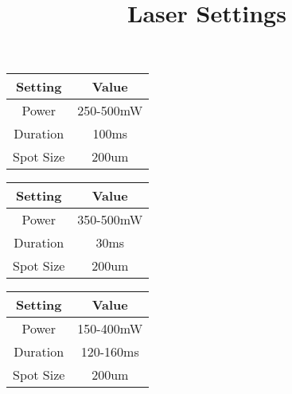 \documentclass[docmentpaper=a4,oneside.fontsize=12pt,parskip=full]{scrartcl}
\title{Laser Settings}
\date{}
\author{}
\begin{document}
\maketitle


\begin{table}[h]
	\centering
	\begin{tabular}{|c|c|}
		\hline
		Setting & Value\\
		\hline
		Power & 250-500mW \\
		\hline
		Duration & 100ms \\
		\hline
		Spot Size & 200um\\
		\hline
	\end{tabular}
\end{table}


\begin{table}[h]
	\centering
	\begin{tabular}{|c|c|}
		\hline
		Setting & Value\\
		\hline
		Power & 350-500mW \\
		\hline
		Duration & 30ms \\
		\hline
		Spot Size & 200um\\
		\hline
	\end{tabular}
\end{table}


\begin{table}[h]
	\centering
	\begin{tabular}{|c|c|}
		\hline
		Setting & Value\\
		\hline
		Power & 150-400mW \\
		\hline
		Duration & 120-160ms \\
		\hline
		Spot Size & 200um\\
		\hline
	\end{tabular}
\end{table}
\end{document}
